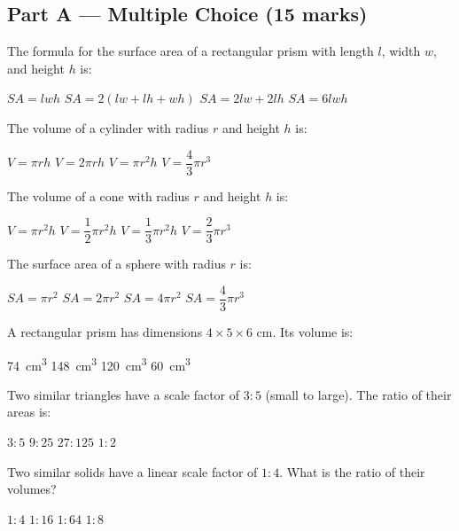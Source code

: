 \documentclass[addpoints]{exam}
\begin{document}
\newpage
\begin{questions}

\section*{Part A --- Multiple Choice (15 marks)}
\vspace{5mm}

\question[1]
The formula for the surface area of a rectangular prism with length $l$, width $w$, and height $h$ is:
\begin{choices}
    \choice $SA = lwh$
    \correctchoice $SA = 2(lw + lh + wh)$
    \choice $SA = 2lw + 2lh$
    \choice $SA = 6lwh$
\end{choices}

\question[1]
The volume of a cylinder with radius $r$ and height $h$ is:
\begin{choices}
    \choice $V = \pi r h$
    \choice $V = 2\pi r h$
    \correctchoice $V = \pi r^2 h$
    \choice $V = \dfrac{4}{3}\pi r^3$
\end{choices}

\question[1]
The volume of a cone with radius $r$ and height $h$ is:
\begin{choices}
    \choice $V = \pi r^2 h$
    \choice $V = \dfrac{1}{2}\pi r^2 h$
    \correctchoice $V = \dfrac{1}{3}\pi r^2 h$
    \choice $V = \dfrac{2}{3}\pi r^3$
\end{choices}

\question[1]
The surface area of a sphere with radius $r$ is:
\begin{choices}
    \choice $SA = \pi r^2$
    \choice $SA = 2\pi r^2$
    \correctchoice $SA = 4\pi r^2$
    \choice $SA = \dfrac{4}{3}\pi r^3$
\end{choices}

\question[1]
A rectangular prism has dimensions $4 \times 5 \times 6$ cm. Its volume is:
\begin{choices}
    \choice \SI{74}{cm^3}
    \choice \SI{148}{cm^3}
    \correctchoice \SI{120}{cm^3}
    \choice \SI{60}{cm^3}
\end{choices}

\question[1]
Two similar triangles have a scale factor of $3:5$ (small to large). The ratio of their areas is:
\begin{choices}
    \choice $3:5$
    \correctchoice $9:25$
    \choice $27:125$
    \choice $1:2$
\end{choices}

\question[1]
Two similar solids have a linear scale factor of $1:4$. What is the ratio of their volumes?
\begin{choices}
    \choice $1:4$
    \choice $1:16$
    \correctchoice $1:64$
    \choice $1:8$
\end{choices}


\end{questions}
\end{document}

